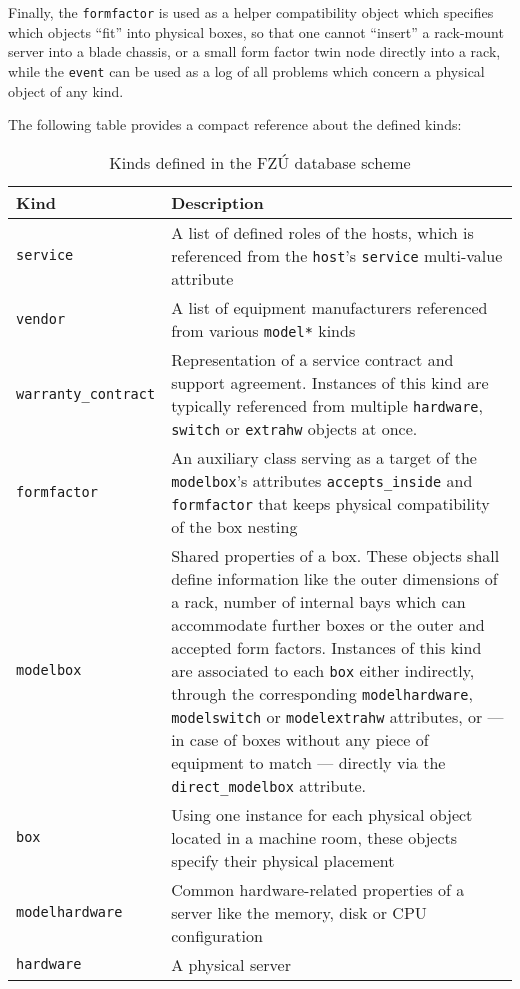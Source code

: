\documentclass[deska]{subfiles}
\begin{document}
Finally, the {\tt formfactor} is used as a helper compatibility object which specifies which objects ``fit'' into
physical boxes, so that one cannot ``insert'' a rack-mount server into a blade chassis, or a small form factor twin node
directly into a rack, while the {\tt event} can be used as a log of all problems which concern a physical object of any
kind.

The following table provides a compact reference about the defined kinds:

\begin{longtable}{ l | l}
    \caption{Kinds defined in the FZÚ database scheme} \\
    Kind & Description \\
    \hline
    \endhead
    \label{tbl:fzu-kinds}
    {\tt service} & A list of defined roles of the hosts, which is referenced from the {\tt host}'s {\tt service}
    multi-value attribute \\
    {\tt vendor} & A list of equipment manufacturers referenced from various {\tt model*} kinds \\
    {\tt warranty\_contract} & Representation of a service contract and support agreement.  Instances of this kind are
    typically referenced from multiple {\tt hardware}, {\tt switch} or {\tt extrahw} objects at once. \\
    {\tt formfactor} & An auxiliary class serving as a target of the {\tt modelbox}'s attributes {\tt accepts\_inside}
    and {\tt formfactor} that keeps physical compatibility of the box nesting \\
    {\tt modelbox} & Shared properties of a box.  These objects shall define information like the outer dimensions of a
    rack, number of internal bays which can accommodate further boxes or the outer and accepted form factors.  Instances
    of this kind are associated to each {\tt box} either indirectly, through the corresponding {\tt modelhardware},
    {\tt modelswitch} or {\tt modelextrahw} attributes, or --- in case of boxes without any piece of equipment to match
    --- directly via the {\tt direct\_modelbox} attribute. \\
    {\tt box} & Using one instance for each physical object located in a machine room, these objects specify their
    physical placement \\
    {\tt modelhardware} & Common hardware-related properties of a server like the memory, disk or CPU configuration \\
    {\tt hardware} & A physical server \\

\end{longtable}
\end{document}
